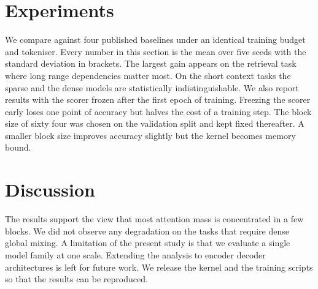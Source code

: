 \documentclass[10pt,twocolumn]{article}
\newcommand{\s}[1]{#1}
\begin{document}
\section{Experiments}

\s{We compare against four published baselines under an identical training budget and tokeniser.}
\s{Every number in this section is the mean over five seeds with the standard deviation in brackets.}
\s{The largest gain appears on the retrieval task where long range dependencies matter most.}
\s{On the short context tasks the sparse and the dense models are statistically indistinguishable.}
\s{We also report results with the scorer frozen after the first epoch of training.}
\s{Freezing the scorer early loses one point of accuracy but halves the cost of a training step.}
\s{The block size of sixty four was chosen on the validation split and kept fixed thereafter.}
\s{A smaller block size improves accuracy slightly but the kernel becomes memory bound.}

\section{Discussion}

\s{The results support the view that most attention mass is concentrated in a few blocks.}
\s{We did not observe any degradation on the tasks that require dense global mixing.}
\s{A limitation of the present study is that we evaluate a single model family at one scale.}
\s{Extending the analysis to encoder decoder architectures is left for future work.}
\s{We release the kernel and the training scripts so that the results can be reproduced.}
\end{document}
